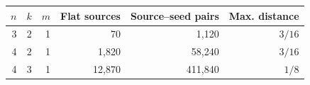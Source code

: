 \begin{tabular}{rrrrrr}
\toprule
$n$ & $k$ & $m$ & Flat sources & Source--seed pairs & Max. distance \\
\midrule
3 & 2 & 1 & 70 & 1,120 & $3/16$ \\
4 & 2 & 1 & 1,820 & 58,240 & $3/16$ \\
4 & 3 & 1 & 12,870 & 411,840 & $1/8$ \\
\bottomrule
\end{tabular}
